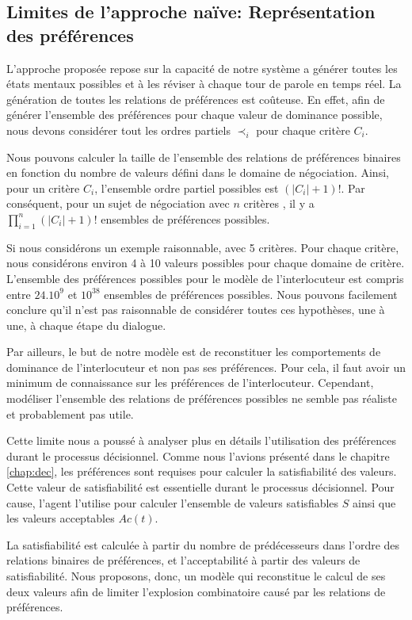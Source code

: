 \subsection{Limites de l'approche naïve: Représentation des préférences}

L'approche proposée repose sur la capacité de notre système a générer toutes les états mentaux possibles et à les réviser à chaque tour de parole en temps réel. La génération de toutes les relations de préférences est coûteuse. En effet, afin de générer l'ensemble des préférences pour chaque valeur de dominance possible, nous devons considérer tout les ordres partiels $\prec_i$ pour chaque critère $C_i$. 

Nous pouvons calculer la taille de l'ensemble des relations de préférences binaires en fonction du nombre de valeurs défini dans le domaine de négociation. Ainsi, pour un critère $C_i$, l'ensemble ordre partiel possibles est  $(|C_i|+1)! $. Par conséquent, pour un sujet de négociation avec $n$ critères , il y a $\prod_{i=1}^n (|C_i|+1)!$ ensembles de préférences possibles.


Si nous considérons un exemple raisonnable, avec 5 critères. Pour chaque critère, nous considérons environ 4 à 10 valeurs possibles pour chaque domaine de critère. L'ensemble des préférences possibles pour le modèle de l'interlocuteur est compris entre $ 24.10 ^ 9 $ et $ 10 ^ {38} $ ensembles de préférences possibles.
Nous pouvons facilement conclure qu'il n'est pas raisonnable de considérer toutes ces hypothèses, une à une, à chaque étape du dialogue.

Par ailleurs, le but de notre modèle est de reconstituer les comportements de dominance de l'interlocuteur et non pas ses préférences. Pour cela, il faut avoir un minimum de connaissance sur les préférences de l'interlocuteur. Cependant, modéliser l'ensemble des relations de préférences possibles ne semble pas réaliste et probablement pas utile.

Cette limite nous a poussé à analyser plus en détails l'utilisation des préférences durant le processus décisionnel. Comme nous l'avions présenté dans le chapitre \ref{chap:dec}, les préférences sont requises pour calculer la satisfiabilité des valeurs. Cette valeur de satisfiabilité est essentielle durant le processus décisionnel. Pour cause, l'agent l'utilise pour calculer l'ensemble de valeurs satisfiables $S$ ainsi que les valeurs acceptables $Ac(t)$.

La satisfiabilité est calculée à partir du nombre de prédécesseurs dans l'ordre des relations binaires de préférences, et l'acceptabilité à partir des valeurs de satisfiabilité. Nous proposons, donc, un modèle qui reconstitue le calcul de ses deux valeurs afin de limiter l'explosion combinatoire causé par les relations de préférences. 

